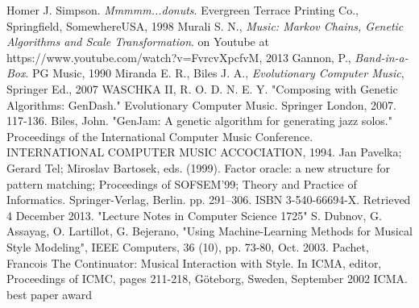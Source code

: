 \begin{thebibliography}{50}
   Homer J. Simpson. \textsl{Mmmmm...donuts}.
		Evergreen Terrace Printing Co., Springfield, SomewhereUSA, 1998
   Murali S. N., \textsl{Music: Markov Chains, Genetic Algorithms and Scale Transformation}.
		on Youtube at https://www.youtube.com/watch?v=FvrcvXpcfvM, 2013
   Gannon, P., \textsl{Band-in-a-Box}. PG Music, 1990
   Miranda E. R., Biles J. A., \textsl{Evolutionary Computer Music}, Springer Ed., 2007
   WASCHKA II, R. O. D. N. E. Y. "Composing with Genetic Algorithms: GenDash." Evolutionary Computer Music. Springer London, 2007. 117-136.
   Biles, John. "GenJam: A genetic algorithm for generating jazz solos." Proceedings of the International Computer Music Conference. INTERNATIONAL COMPUTER MUSIC ACCOCIATION, 1994.
    Jan Pavelka; Gerard Tel; Miroslav Bartosek, eds. (1999). Factor oracle: a new structure for pattern matching; Proceedings of SOFSEM’99; Theory and Practice of Informatics. Springer-Verlag, Berlin. pp. 291–306. ISBN 3-540-66694-X. Retrieved 4 December 2013. "Lecture Notes in Computer Science 1725"
   S. Dubnov, G. Assayag, O. Lartillot, G. Bejerano, "Using Machine-Learning Methods for Musical Style Modeling", IEEE Computers, 36 (10), pp. 73-80, Oct. 2003.
   Pachet, Francois The Continuator: Musical Interaction with Style. In ICMA, editor, Proceedings of ICMC, pages 211-218, Göteborg, Sweden, September 2002 ICMA. best paper award 
  \end{thebibliography}
